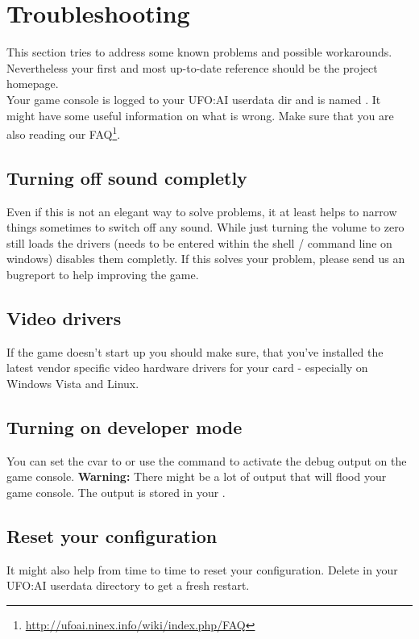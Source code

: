 \section{Troubleshooting}
This section tries to address some known problems and possible workarounds. Nevertheless your first and most up-to-date reference should be the project homepage.\\
Your game console is logged to your UFO:AI userdata dir and is named . It might have some useful information on what is wrong. Make sure that you are also reading our FAQ\footnote{\url{http://ufoai.ninex.info/wiki/index.php/FAQ}}.

\subsection{Turning off sound completly}
Even if this is not an elegant way to solve problems, it at least helps to narrow things sometimes to switch off any sound. While just turning the volume to zero still loads the drivers  (needs to be entered within the shell / command line on windows) disables them completly. If this solves your problem, please send us an bugreport to help improving the game.

\subsection{Video drivers}
If the game doesn't start up you should make sure, that you've installed the latest vendor specific video hardware drivers for your card - especially on Windows Vista and Linux.

\subsection{Turning on developer mode}
You can set the cvar  to  or use the  command to activate the debug output on the game console. \textbf{Warning:} There might be a lot of output that will flood your game console. The output is stored in your .

\subsection{Reset your configuration}
It might also help from time to time to reset your configuration. Delete  in your UFO:AI userdata directory to get a fresh restart.
